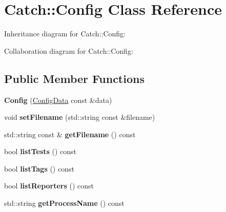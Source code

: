 \hypertarget{classCatch_1_1Config}{}\section{Catch\+:\+:Config Class Reference}
\label{classCatch_1_1Config}


Inheritance diagram for Catch\+:\+:Config\+:


Collaboration diagram for Catch\+:\+:Config\+:
\subsection*{Public Member Functions}
\begin{DoxyCompactItemize}
\item 
{\bfseries Config} (\hyperlink{structCatch_1_1ConfigData}{Config\+Data} const \&data)\hypertarget{classCatch_1_1Config_a25ad0360a8386e7bc068c9c1ac5320bf}{}\label{classCatch_1_1Config_a25ad0360a8386e7bc068c9c1ac5320bf}

\item 
void {\bfseries set\+Filename} (std\+::string const \&filename)\hypertarget{classCatch_1_1Config_a08d869cec45133f75153a3e0f6095c71}{}\label{classCatch_1_1Config_a08d869cec45133f75153a3e0f6095c71}

\item 
std\+::string const \& {\bfseries get\+Filename} () const \hypertarget{classCatch_1_1Config_aa9e256dae92ddb8502ff3680f8a5d87f}{}\label{classCatch_1_1Config_aa9e256dae92ddb8502ff3680f8a5d87f}

\item 
bool {\bfseries list\+Tests} () const \hypertarget{classCatch_1_1Config_aea015d29bfbe2518c4645ff0ea6d210e}{}\label{classCatch_1_1Config_aea015d29bfbe2518c4645ff0ea6d210e}

\item 
bool {\bfseries list\+Tags} () const \hypertarget{classCatch_1_1Config_a9dff59d5f71ce2d43719926d017e496e}{}\label{classCatch_1_1Config_a9dff59d5f71ce2d43719926d017e496e}

\item 
bool {\bfseries list\+Reporters} () const \hypertarget{classCatch_1_1Config_a3107e37f61a84ca8914a107ecd1cb343}{}\label{classCatch_1_1Config_a3107e37f61a84ca8914a107ecd1cb343}

\item 
std\+::string {\bfseries get\+Process\+Name} () const \hypertarget{classCatch_1_1Config_a7b0b80011521c7247f2365e213d0057c}{}\label{classCatch_1_1Config_a7b0b80011521c7247f2365e213d0057c}


\end{DoxyCompactItemize}
